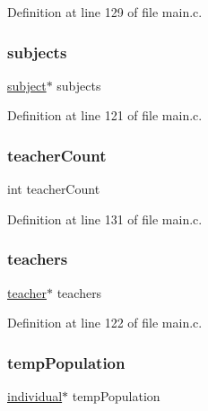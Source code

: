 Definition at line 129 of file main.\+c.

\hypertarget{structparams_ac0065089e5d0a97eab579cb4c6d7b81e}{}\label{structparams_ac0065089e5d0a97eab579cb4c6d7b81e} 
\subsubsection{\texorpdfstring{subjects}{subjects}}
{\footnotesize\ttfamily \hyperlink{structsubject}{subject}$\ast$ subjects}



Definition at line 121 of file main.\+c.

\hypertarget{structparams_a2039ccbb20de4e0c03414b44da9687a6}{}\label{structparams_a2039ccbb20de4e0c03414b44da9687a6} 
\subsubsection{\texorpdfstring{teacher\+Count}{teacherCount}}
{\footnotesize\ttfamily int teacher\+Count}



Definition at line 131 of file main.\+c.

\hypertarget{structparams_a97805952f15a81f9f4555ccf10e03ace}{}\label{structparams_a97805952f15a81f9f4555ccf10e03ace} 
\subsubsection{\texorpdfstring{teachers}{teachers}}
{\footnotesize\ttfamily \hyperlink{structteacher}{teacher}$\ast$ teachers}



Definition at line 122 of file main.\+c.

\hypertarget{structparams_af22352163e1202f216654fdb35c5870a}{}\label{structparams_af22352163e1202f216654fdb35c5870a} 
\subsubsection{\texorpdfstring{temp\+Population}{tempPopulation}}
{\footnotesize\ttfamily \hyperlink{structindividual}{individual}$\ast$ temp\+Population}



